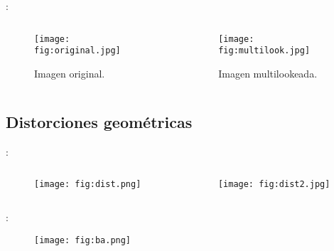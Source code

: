 \begin{frame}{\secname : \subsecname}
  \begin{columns}
  \begin{column}{0.5\textwidth}
    \begin{figure}
      \centering
      \texttt{[image: fig:original.jpg]}
      \caption{Imagen original.}
      \label{}
    \end{figure}
  \end{column}
  \begin{column}{0.5\textwidth}  %
    \begin{figure}
      \centering
      \texttt{[image: fig:multilook.jpg]}
      \caption{Imagen multilookeada.}
      \label{}
    \end{figure}
  \end{column}
  \end{columns}
\end{frame}


\subsection{Distorciones geométricas}

\begin{frame}{\secname : \subsecname}
  \begin{columns}[t]
    \begin{column}{0.5\textwidth}
      \begin{figure}
        \centering
        \texttt{[image: fig:dist.png]}
        \caption{}
        \label{}
      \end{figure}
    \end{column}
    \begin{column}{0.5\textwidth}  %
        \begin{figure}
          \centering
          \texttt{[image: fig:dist2.jpg]}
          \caption{}
          \label{}
        \end{figure}
    \end{column}
    \end{columns}
\end{frame}

\begin{frame}{\secname : \subsecname}
    \begin{figure}
      \centering
      \texttt{[image: fig:ba.png]}
      \caption{}
      \label{}
    \end{figure}
\end{frame}

